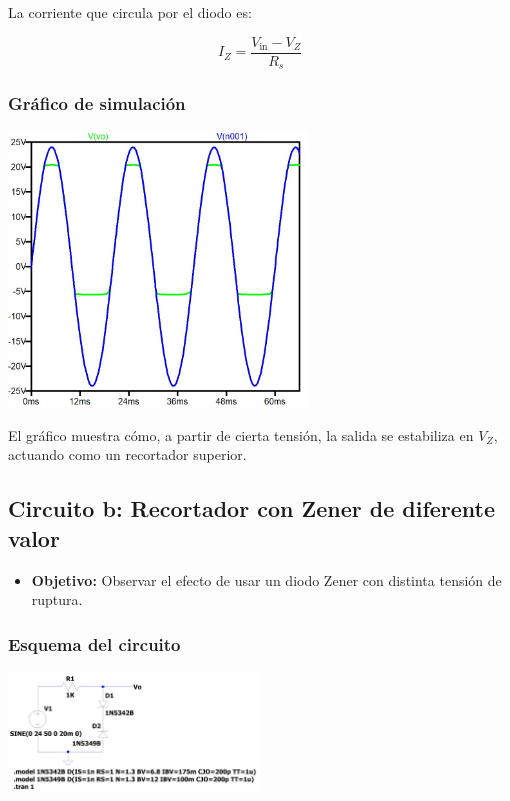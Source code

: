 \documentclass[chaptersright]{informeutn}
\begin{document}
La corriente que circula por el diodo es:

\[
I_Z = \frac{V_{\text{in}} - V_Z}{R_s}
\]

\subsubsection*{Gráfico de simulación}
\begin{center}
    \includegraphics[width=0.6\textwidth]{pictures/zener_1_grafico.jpeg}
\end{center}

\noindent
El gráfico muestra cómo, a partir de cierta tensión, la salida se estabiliza en \( V_Z \), actuando como un recortador superior.


\subsection*{Circuito b: Recortador con Zener de diferente valor}

\begin{itemize}
    \item \textbf{Objetivo:} Observar el efecto de usar un diodo Zener con distinta tensión de ruptura.
\end{itemize}

\subsubsection*{Esquema del circuito}
\begin{center}
    \includegraphics[width=0.5\textwidth]{pictures/zener_2_circuito.jpeg}
\end{center}
\end{document}

